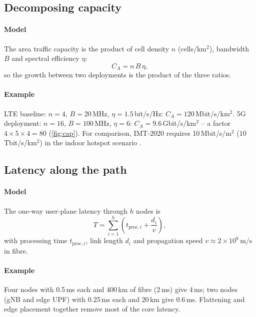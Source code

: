 \documentclass[11pt,a4paper]{article}
\begin{document}
\subsection{Decomposing capacity}\label{sec:cap}
\paragraph{Model} The area traffic capacity is the product of cell density $n$ (cells/km$^2$), bandwidth $B$ and spectral efficiency $\eta$:
\begin{equation}\label{eq:area}
  C_A = n\, B\, \eta ,
\end{equation}
so the growth between two deployments is the product of the three ratios.
\paragraph{Example} LTE baseline: $n = 4$, $B = 20$\,MHz, $\eta = 1.5$\,bit/s/Hz: $C_A = 120$\,Mbit/s/km$^2$. 5G deployment: $n = 16$, $B = 100$\,MHz,
$\eta = 6$: $C_A = 9.6$\,Gbit/s/km$^2$ -- a factor $4\times5\times4 = 80$ (\cref{fig:cap}). For comparison, IMT-2020 requires 10\,Mbit/s/m$^2$
($10$\,Tbit/s/km$^2$) in the indoor hotspot scenario \cite{itu2017m2410}.

\begin{acnfigure}
  \caption{Area-capacity growth from the LTE baseline to the 5G deployment of \cref{sec:cap}.}
  \label{fig:cap}
\end{acnfigure}

\subsection{Latency along the path}\label{sec:path}
\paragraph{Model} The one-way user-plane latency through $h$ nodes is
\begin{equation}\label{eq:path}
  T = \sum_{i=1}^{h} \left( t_{\mathrm{proc},i} + \frac{d_i}{v} \right) ,
\end{equation}
with processing time $t_{\mathrm{proc},i}$, link length $d_i$ and propagation speed $v \approx 2\times10^{8}$\,m/s in fibre.
\paragraph{Example} Four nodes with 0.5\,ms each and 400\,km of fibre (2\,ms) give 4\,ms; two nodes (gNB and edge UPF) with 0.25\,ms each and 20\,km give
0.6\,ms. Flattening and edge placement together remove most of the core latency.
\end{document}
